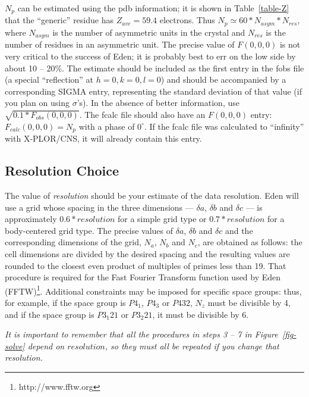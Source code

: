\documentclass{report}
\begin{document}
$N_p$ can be estimated using the pdb information; 
it is shown in Table~\ref{table-Z}
that the ``generic'' residue has $Z_{ave} = 59.4$ electrons.  Thus
$N_p \simeq 60 * N_{asym} * N_{res}$,
where $N_{asym}$ is the number of asymmetric units in the crystal and 
$N_{res}$ is the number of residues in an asymmetric unit.  
The precise value of $F(0,0,0)$ is not 
very critical to the success of Eden; it is probably best to err on the
low side by about 10 -- 20\%.  The estimate should be included 
as the first entry in the fobs file (a special ``reflection'' at $h=0, k=0, l=0$)
and should be accompanied by a corresponding SIGMA entry, representing
the standard deviation of that value (if you plan on using $\sigma$'s).
In the absence of better information, use $\sqrt{0.1 * F_{obs}(0,0,0)}$.
The fcalc file should also have an $F(0,0,0)$ entry: 
$ F_{calc}(0,0,0) =  N_p $ with a phase of $0^\circ$.  
If the fcalc file was calculated to ``infinity''
with X-PLOR/CNS, it will already contain this entry.

\subsection {Resolution Choice} 
\label{solver-preparation-resolution}

The value of {\it resolution} should be your estimate of
the data resolution.  Eden will
use a grid whose spacing in the three dimensions ---
$\delta{a}$, $\delta{b}$ and $\delta{c}$ --- is approximately
$0.6*resolution$ for a simple grid type or $0.7*resolution$ for a 
body-centered grid type.
The precise values of $\delta{a}$, $\delta{b}$ and $\delta{c}$ and the corresponding 
dimensions of the grid, $N_a$, $N_b$ and $N_c$, are obtained as follows: 
the cell dimensions are divided by the desired spacing and the resulting 
values are rounded to the closest even product of multiples of primes
less than 19.
That procedure is required for the Fast Fourier Transform function used 
by Eden (FFTW)\footnote{http://www.fftw.org}. 
Additional constraints may be imposed for specific space groups: thus, for 
example, if the space group is $P4_{1}$, $P4_{3}$ or $P432$, $N_z$ must be 
divisible by 4, and if the space group is $P3_{1}21$ or $P3_{2}21$, 
it must be divisible by 6.

\vspace {0.1in}

{\em It is important to remember that all the procedures in steps 3 -- 7 
in Figure~\ref{fig-solve} depend on $resolution$, 
so they must all be repeated if you change that resolution.}
\end{document}
